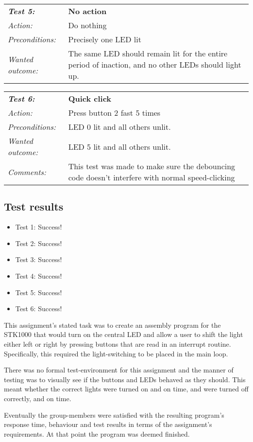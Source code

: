 \vspace{1cm}

\begin{tabular}[h]{|lp{12cm}|} \hline
\textbf{\emph{Test 5:}} 		& \textbf{No action}\\
\emph{Action:} 		& Do nothing\\
\emph{Preconditions:}	& Precisely one LED lit\\
\emph{Wanted outcome:}	& The same LED should remain lit for the entire period of inaction, and no other LEDs should light up.\\ \hline
\end{tabular}

\vspace{1cm}

\begin{tabular}[h]{|lp{12cm}|} \hline
\textbf{\emph{Test 6:}} 		& \textbf{Quick click}\\
\emph{Action:} 		& Press button 2 fast 5 times\\
\emph{Preconditions:}	& LED 0 lit and all others unlit.\\
\emph{Wanted outcome:}	& LED 5 lit and all others unlit.\\
\emph{Comments:}		& This test was made to make sure the debouncing code doesn’t interfere with normal speed-clicking \\ \hline
\end{tabular}

\subsection{Test results}
\begin{itemize}
\item Test 1: Success!
\item Test 2: Success!
\item Test 3: Success!
\item Test 4: Success!
\item Test 5: Success!
\item Test 6: Success!
\end{itemize}

This assignment’s stated task was to create an assembly program for the STK1000 that would turn on the central LED and allow a user to shift the light either left or right by pressing buttons that are read in an interrupt routine. Specifically, this required the light-switching to be placed in the main loop.

There was no formal test-environment for this assignment and the manner of testing was to visually see if the buttons and LEDs behaved as they should. This meant whether the correct lights were turned on and on time, and were turned off correctly, and on time. 

Eventually the group-members were satisfied with the resulting program’s response time, behaviour and test results in terms of the assignment’s requirements. At that point the program was deemed finished.
